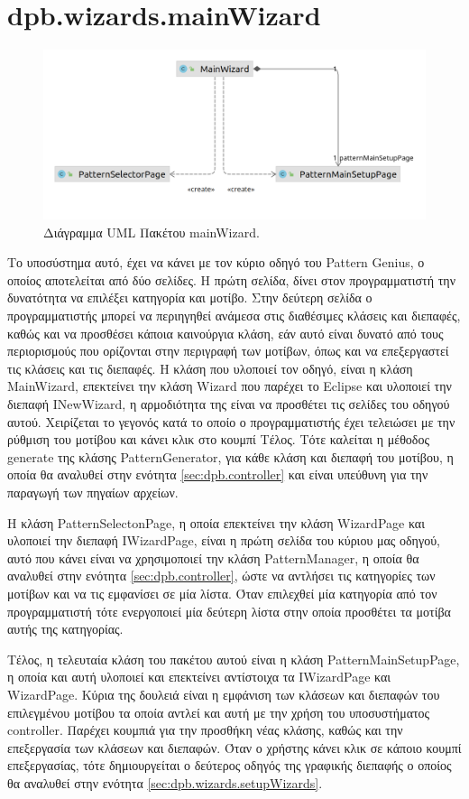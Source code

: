\section{dpb.wizards.mainWizard}
\label{sec:dpb.wizards.mainWizard}
\begin{figure}[H]
    \centering
    \includegraphics[width=1.0\textwidth]{Figures/mainWizard.png}
    \caption{Διάγραμμα UML Πακέτου mainWizard.}
    \label{fig:mainWizardUML}
\end{figure}
\par
Το υποσύστημα αυτό, έχει να κάνει με τον κύριο οδηγό του Pattern Genius, ο οποίος αποτελείται από δύο σελίδες. Η πρώτη σελίδα, 
δίνει στον προγραμματιστή την δυνατότητα να επιλέξει κατηγορία και μοτίβο. Στην δεύτερη σελίδα ο προγραμματιστής μπορεί να περιηγηθεί 
ανάμεσα στις διαθέσιμες κλάσεις και διεπαφές, καθώς και να προσθέσει κάποια καινούργια κλάση, 
εάν αυτό είναι δυνατό από τους περιορισμούς που ορίζονται στην περιγραφή των μοτίβων, 
όπως και να επεξεργαστεί τις κλάσεις και τις διεπαφές. Η κλάση που υλοποιεί τον οδηγό, είναι η κλάση MainWizard, 
επεκτείνει την κλάση Wizard που παρέχει το Eclipse και υλοποιεί την διεπαφή INewWizard, 
η αρμοδιότητα της είναι να προσθέτει τις σελίδες του οδηγού αυτού. Χειρίζεται το γεγονός κατά το 
οποίο ο προγραμματιστής έχει τελειώσει με την ρύθμιση του μοτίβου και κάνει κλικ στο κουμπί Τέλος.
Τότε καλείται η μέθοδος generate της κλάσης PatternGenerator, για κάθε κλάση και διεπαφή του μοτίβου, 
η οποία θα αναλυθεί στην ενότητα \ref{sec:dpb.controller} και είναι υπεύθυνη για την παραγωγή των πηγαίων αρχείων. \par
Η κλάση PatternSelectonPage, η οποία επεκτείνει την κλάση WizardPage και υλοποιεί την διεπαφή IWizardPage, 
είναι η πρώτη σελίδα του κύριου μας οδηγού, αυτό που κάνει είναι να χρησιμοποιεί την κλάση PatternManager, η οποία 
θα αναλυθεί στην ενότητα \ref{sec:dpb.controller}, ώστε να αντλήσει τις κατηγορίες των μοτίβων και να τις εμφανίσει σε μία λίστα. 
Όταν επιλεχθεί μία κατηγορία από τον προγραμματιστή τότε ενεργοποιεί μία δεύτερη λίστα στην οποία προσθέτει 
τα μοτίβα αυτής της κατηγορίας.\par
Τέλος, η τελευταία κλάση του πακέτου αυτού είναι η κλάση PatternMainSetupPage, 
η οποία και αυτή υλοποιεί και επεκτείνει αντίστοιχα τα IWizardPage και WizardPage. 
Κύρια της δουλειά είναι η εμφάνιση των κλάσεων και διεπαφών του επιλεγμένου μοτίβου τα οποία αντλεί 
και αυτή με την χρήση του υποσυστήματος controller. Παρέχει κουμπιά για την προσθήκη νέας κλάσης, καθώς και 
την επεξεργασία των κλάσεων και διεπαφών. Όταν ο χρήστης κάνει κλικ σε κάποιο κουμπί επεξεργασίας, τότε δημιουργείται 
ο δεύτερος οδηγός της γραφικής διεπαφής ο οποίος θα αναλυθεί στην ενότητα \ref{sec:dpb.wizards.setupWizards}.
